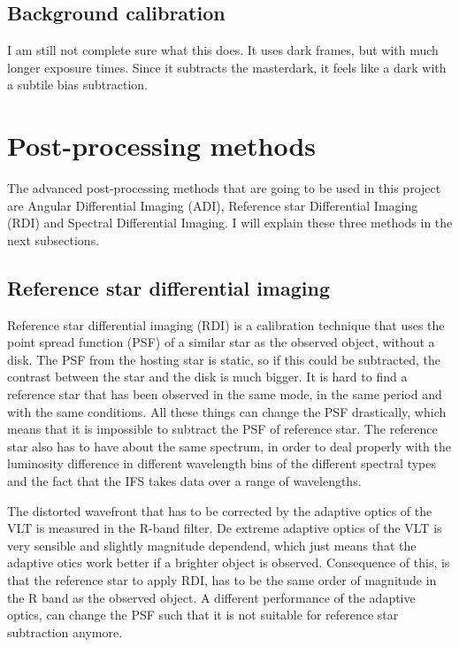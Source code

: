 \documentclass[twoside,single]{lion-msc}
\begin{document}
\subsection{Background calibration}
I am still not complete sure what this does. It uses dark frames, but with much longer exposure times. Since it subtracts the masterdark, it feels like a dark with a subtile bias subtraction.

\clearpage

\section{Post-processing methods}
The advanced post-processing methods that are going to be used in this project are Angular Differential Imaging (ADI), Reference star Differential Imaging (RDI) and Spectral Differential Imaging. I will explain these three methods in the next subsections.

\subsection{Reference star differential imaging}
Reference star differential imaging (RDI) is a calibration technique that uses the point spread function (PSF) of a similar star as the observed object, without a disk. The PSF from the hosting star is static, so if this could be subtracted, the contrast between the star and the disk is much bigger. It is hard to find a reference star that has been observed in the same mode, in the same period and with the same conditions. All these things can change the PSF drastically, which means that it is impossible to subtract the PSF of reference star. The reference star also has to have about the same spectrum, in order to deal properly with the luminosity difference in different wavelength bins of the different spectral types and the fact that the IFS takes data over a range of wavelengths. 
\bigskip

The distorted wavefront that has to be corrected by the adaptive optics of the VLT is measured in the R-band filter. De extreme adaptive optics of the VLT is very sensible and slightly magnitude dependend, which just means that the adaptive otics work better if a brighter object is observed. Consequence of this, is that the reference star to apply RDI, has to be the same order of magnitude in the R band as the observed object. A different performance of the adaptive optics, can change the PSF such that it is not suitable for reference star subtraction anymore. 
\end{document}
